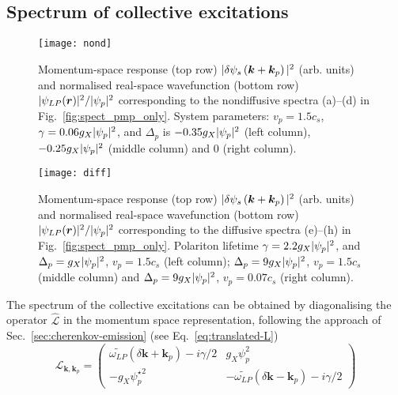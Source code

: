 \subsection{Spectrum of collective excitations}
\label{sec:spect}
%
\begin{figure}[tb]\centering
  \texttt{[image: nond]}
  \caption{
    Momentum-space response (top row) $\vert \delta \psi_s\left(\bm{k} +
        \bm{k}_p \right) \vert^2$ (arb. units) and normalised real-space
    wavefunction (bottom row) $\vert \psi_{LP}(\bm{r}) \vert^2/\vert \psi_p \vert^2$
    corresponding to the nondiffusive spectra (a)--(d) in
    Fig.~\ref{fig:spect_pmp_only}. System parameters: $v_p = 1.5 c_s$,
    $\gamma = 0.06 g_X\vert \psi_p \vert^2$, and $\Delta_p$ is $-0.35
    g_X\vert \psi_p \vert^2$ (left column), $-0.25 g_X\vert \psi_p \vert^2$ (middle
    column) and 0 (right column).
  }\label{fig:nondiffusive}
\end{figure}
%
\begin{figure}[tb]\centering
  \texttt{[image: diff]}
  \caption{
    Momentum-space response (top row) $\vert \delta \psi_s\left(\bm{k} +
        \bm{k}_p \right) \vert^2$ (arb. units) and normalised real-space
    wavefunction (bottom row) $\vert \psi_{LP}(\bm{r}) \vert^2/\vert \psi_p \vert^2$
    corresponding to the diffusive spectra (e)--(h) in
    Fig.~\ref{fig:spect_pmp_only}. Polariton lifetime $\gamma = 2.2
    g_X\vert \psi_p \vert^2$, and $\Delta_p = g_X\vert \psi_p \vert^2$, $v_p = 1.5 c_s$
    (left column); $\Delta_p = 9 g_X\vert \psi_p \vert^2$, $v_p = 1.5 c_s$ (middle
    column) and $\Delta_p = 9 g_X\vert \psi_p \vert^2$, $v_p = 0.07 c_s$ (right
    column).
  }\label{fig:diffusive}
\end{figure}
%
The spectrum of the collective excitations can be obtained by
diagonalising the operator $\hat{\mathcal{L}}$ in the momentum space
representation, following the approach of
Sec.~\ref{sec:cherenkov-emission} (see Eq.~\eqref{eq:translated-L})
%
\begin{equation}
  \mathcal{L}_{\bm{k},\bm{k}_p} = \begin{pmatrix}
    \widetilde{\omega_{LP}} (\delta \bm{k}+\bm{k}_p) - i \gamma/2 &
    g_X \psi_p^2 \\ -g_X {\psi_p^{\star}}^2 & -
    \widetilde{\omega_{LP}}(\delta \bm{k}-\bm{k}_p) -
    i\gamma/2 \end{pmatrix}
\label{eq:opell}
\end{equation}
